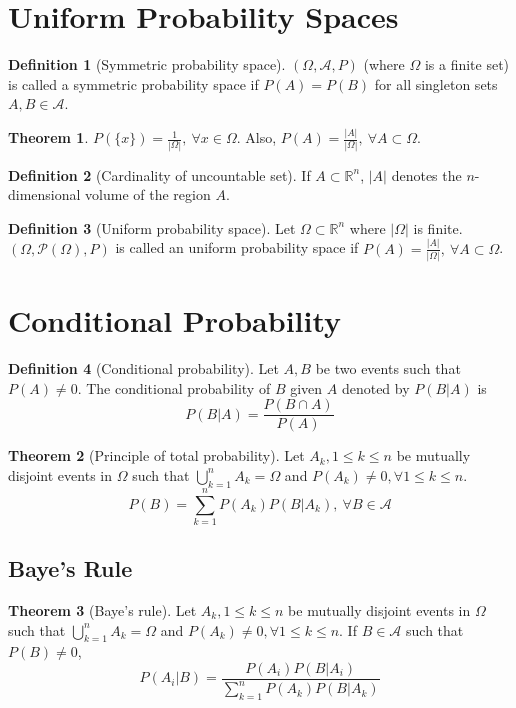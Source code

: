 \documentclass[10pt, a4paper]{extarticle}
\theoremstyle{definition}
\newtheorem{thm}{Theorem}
\newtheorem{defn}{Definition}
\begin{document}
	\section{Uniform Probability Spaces}
	\begin{defn}[Symmetric probability space]
		$(\Omega, \mathscr{A}, P)$ (where $\Omega$ is a finite set) is called a symmetric probability space if $P(A)=P(B)$ for all singleton sets $A,B\in\mathscr{A}$.
	\end{defn}
	\begin{thm}
		$P\left(\{x\}\right)=\frac{1}{|\Omega|},\ \forall x\in\Omega$. Also, $P(A)=\frac{|A|}{|\Omega|},\ \forall A\subset\Omega$.
	\end{thm}
	
	\begin{defn}[Cardinality of uncountable set]
		If $A\subset \mathbb{R}^n$, $|A|$ denotes the $n$-dimensional volume of the region $A$.
	\end{defn}
	\begin{defn}[Uniform probability space]
		Let $\Omega\subset\mathbb{R}^n$ where $|\Omega|$ is finite. $(\Omega,\mathcal{P}(\Omega), P)$ is called an uniform probability space if $P(A)=\frac{|A|}{|\Omega|},\ \forall A\subset\Omega$.
	\end{defn}

	\section{Conditional Probability}
	\begin{defn}[Conditional probability]
		Let $A,B$ be two events such that $P(A)\neq 0$. The conditional probability of $B$ given $A$ denoted by $P(B|A)$ is
		\[P(B|A)=\frac{P(B\cap A)}{P(A)}\]
	\end{defn}
	\begin{thm}[Principle of total probability]
		Let $A_k, 1\leq k\leq n$ be mutually disjoint events in $\Omega$ such that $\bigcup_{k=1}^n A_k=\Omega$ and $P(A_k)\neq 0,\forall 1\leq k\leq n$.
		\[P(B)=\sum_{k=1}^n P(A_k)P(B|A_k),\ \forall B\in\mathscr{A}\]
	\end{thm}

	\subsection{Baye's Rule}
	\begin{thm}[Baye's rule]
		Let $A_k, 1\leq k\leq n$ be mutually disjoint events in $\Omega$ such that $\bigcup_{k=1}^n A_k=\Omega$ and $P(A_k)\neq 0,\forall 1\leq k\leq n$. If $B\in\mathscr{A}$ such that $P(B)\neq 0$,
		\[P(A_i|B)=\frac{P(A_i)P(B|A_i)}{\sum_{k=1}^n P(A_k)P(B|A_k)}\]
	\end{thm}
	
\end{document}
